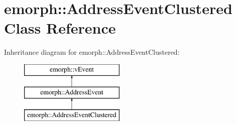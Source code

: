 \hypertarget{classemorph_1_1AddressEventClustered}{\section{emorph\-:\-:Address\-Event\-Clustered Class Reference}
\label{classemorph_1_1AddressEventClustered}
}
Inheritance diagram for emorph\-:\-:Address\-Event\-Clustered\-:\begin{figure}[H]
\begin{center}
\leavevmode
\includegraphics[height=3.000000cm]{classemorph_1_1AddressEventClustered}
\end{center}
\end{figure}
